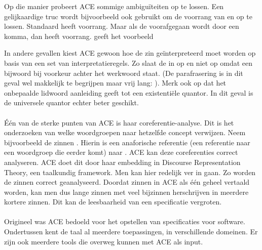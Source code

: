 Op die manier probeert ACE sommige ambigu\"iteiten op te lossen. Een gelijkaardige truc wordt bijvoorbeeld ook gebruikt om de voorrang van  en  op te lossen. Standaard heeft  voorrang. Maar als de  voorafgegaan wordt door een komma, dan heeft  voorrang. \cite{ACEConstructionRules} geeft het voorbeeld 

In andere gevallen kiest ACE gewoon hoe de zin ge\"interpreteerd moet worden op basis van een set van interpretatieregels. Zo slaat de  in  \cite{ACEConstructionRules} op  en niet op  omdat een bijwoord bij voorkeur achter het werkwoord staat. (De parafrasering is in dit geval wel makkelijk te begrijpen maar vrij lang: ). Merk ook op dat het onbepaalde lidwoord aanleiding geeft tot een existenti\"ele quantor. In dit geval is de universele quantor echter beter geschikt.

\paragraph{} \'E\'en van de sterke punten van ACE is haar coreferentie-analyse. Dit is het onderzoeken van welke woordgroepen naar hetzelfde concept verwijzen. Neem bijvoorbeeld de zinnen . Hierin is  een anaforische referentie (een referentie naar een woordgroep die eerder komt) naar . ACE kan deze coreferenties correct analyseren. ACE doet dit door haar embedding in Discourse Representation Theory, een taalkundig framework. Men kan hier redelijk ver in gaan. Zo worden de zinnen  correct geanalyseerd. Doordat zinnen in ACE als \'e\'en geheel vertaald worden, kan men dus lange zinnen met veel bijzinnen herschrijven in meerdere kortere zinnen. Dit kan de leesbaarheid van een specificatie vergroten.

\paragraph{} Origineel was ACE bedoeld voor het opstellen van specificaties voor software. Ondertussen kent de taal al meerdere toepassingen, in verschillende domeinen. Er zijn ook meerdere tools die overweg kunnen met ACE als input.

